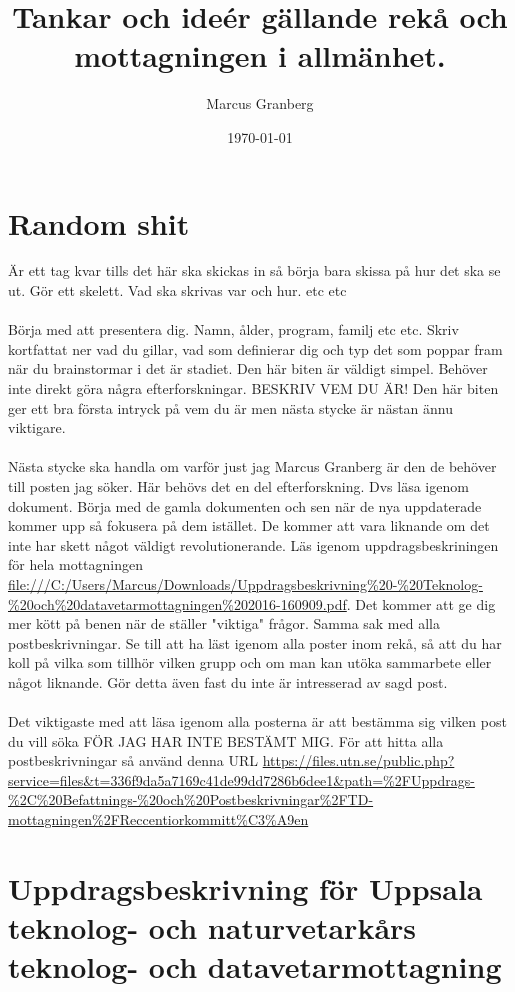 \documentclass[a4paper]{article}
\title{Tankar och ideér gällande rekå och mottagningen 
i allmänhet. }
\author{Marcus Granberg}
\date{\today}
\begin{document}
\maketitle

\newpage

\section{Random shit}

Är ett tag kvar tills det här ska skickas in så börja 
bara skissa på hur det ska se ut. Gör ett skelett. Vad 
ska skrivas var och hur. etc etc \\ \\ 
Börja med att presentera dig. Namn, ålder, program, 
familj etc etc. Skriv kortfattat ner vad du gillar, 
vad som definierar dig och typ det som poppar fram när 
du brainstormar i det är stadiet. Den här biten är 
väldigt simpel. Behöver inte direkt göra några 
efterforskningar. BESKRIV VEM DU ÄR! Den här biten ger 
ett bra första intryck på vem du är men nästa stycke 
är nästan ännu viktigare. \\ \\
Nästa stycke ska handla om varför just jag Marcus 
Granberg är den de behöver till posten jag söker. Här 
behövs det en del efterforskning. Dvs läsa igenom 
dokument. Börja med de gamla dokumenten och sen när de 
nya uppdaterade kommer upp så fokusera på dem 
istället. De kommer att vara liknande om det inte har 
skett något väldigt revolutionerande. Läs igenom 
uppdragsbeskriningen för hela mottagningen 
\url{file:///C:/Users/Marcus/Downloads/Uppdragsbeskrivning%20-%20Teknolog-%20och%20datavetarmottagningen%202016-160909.pdf}.
Det kommer att ge dig mer kött på benen när de ställer 
"viktiga" frågor. Samma sak med alla 
postbeskrivningar. Se till att ha läst igenom alla 
poster inom rekå, så att du har koll på vilka som 
tillhör vilken grupp och om man kan utöka sammarbete 
eller något liknande. Gör detta även fast du inte är 
intresserad av sagd post. \\ \\
Det viktigaste med att läsa igenom alla posterna är 
att bestämma sig vilken post du vill söka FÖR JAG HAR 
INTE BESTÄMT MIG. För att hitta alla postbeskrivningar 
så använd denna URL 
\url{https://files.utn.se/public.php?service=files&t=336f9da5a7169c41de99dd7286b6dee1&path=%2FUppdrags-%2C%20Befattnings-%20och%20Postbeskrivningar%2FTD-mottagningen%2FReccentiorkommitt%C3%A9en}

\section{Uppdragsbeskrivning för Uppsala teknolog- och 
naturvetarkårs teknolog- och datavetarmottagning}
\end{document}
